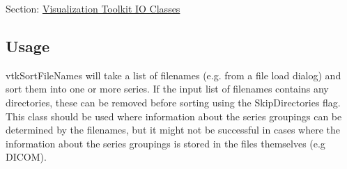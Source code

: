 Section\-: \hyperlink{sec_vtkio}{Visualization Toolkit I\-O Classes} \hypertarget{vtkwidgets_vtkxyplotwidget_Usage}{}\subsection{Usage}\label{vtkwidgets_vtkxyplotwidget_Usage}
vtk\-Sort\-File\-Names will take a list of filenames (e.\-g. from a file load dialog) and sort them into one or more series. If the input list of filenames contains any directories, these can be removed before sorting using the Skip\-Directories flag. This class should be used where information about the series groupings can be determined by the filenames, but it might not be successful in cases where the information about the series groupings is stored in the files themselves (e.\-g D\-I\-C\-O\-M).

